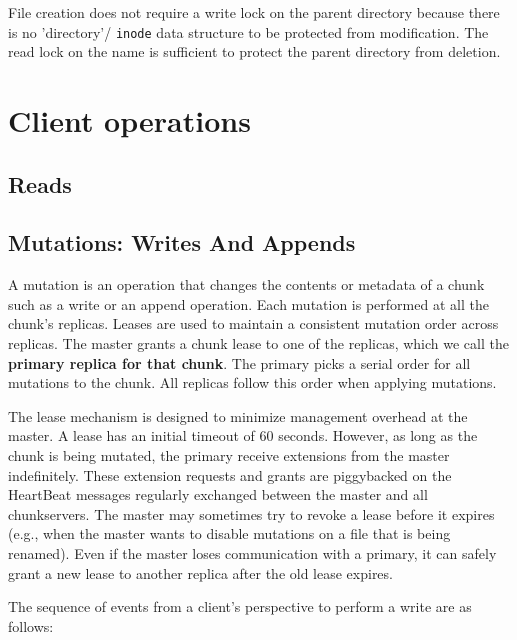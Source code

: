 \documentclass{article}
\begin{document}
File creation does not require a write lock on the parent directory because
there is no 'directory'/ \texttt{inode} data structure to be protected from
modification.  The read lock on the name is sufficient to protect the parent
directory from deletion.

\section{Client operations}

\subsection{Reads}

\subsection{Mutations: Writes And Appends}

A mutation is an operation that changes the contents or metadata of a chunk
such as a write or an append operation. Each mutation is performed at all the
chunk’s replicas. Leases are used to maintain a consistent mutation order across
replicas. The master grants a chunk lease to one of the replicas, which we call
the \textbf{primary replica for that chunk}. The primary picks a serial order for all mutations to the chunk.
All replicas follow this order when applying mutations. 

The lease mechanism is designed to minimize management overhead at the master.
A lease has an initial timeout of 60 seconds. However, as long as the chunk 
is being mutated, the primary receive extensions from the master indefinitely.
These extension requests and grants are piggybacked on the HeartBeat messages
regularly exchanged between the master and all chunkservers.  The master may
sometimes try to revoke a lease before it expires (e.g., when the master wants
to disable mutations on a file that is being renamed). Even if the master loses
communication with a primary, it can safely grant a new lease to another
replica after the old lease expires.

The sequence of events from a client's perspective to perform a write
are as follows:
\end{document}
